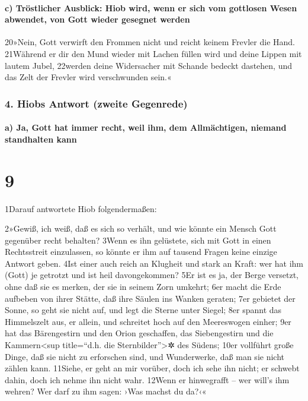 \hypertarget{c-truxf6stlicher-ausblick-hiob-wird-wenn-er-sich-vom-gottlosen-wesen-abwendet-von-gott-wieder-gesegnet-werden}{%
\paragraph{c) Tröstlicher Ausblick: Hiob wird, wenn er sich vom
gottlosen Wesen abwendet, von Gott wieder gesegnet
werden}\label{c-truxf6stlicher-ausblick-hiob-wird-wenn-er-sich-vom-gottlosen-wesen-abwendet-von-gott-wieder-gesegnet-werden}}

20»Nein, Gott verwirft den Frommen nicht und reicht keinem Frevler die
Hand. 21Während er dir den Mund wieder mit Lachen füllen wird und deine
Lippen mit lautem Jubel, 22werden deine Widersacher mit Schande bedeckt
dastehen, und das Zelt der Frevler wird verschwunden sein.«

\hypertarget{hiobs-antwort-zweite-gegenrede}{%
\subsubsection{4. Hiobs Antwort (zweite
Gegenrede)}\label{hiobs-antwort-zweite-gegenrede}}

\hypertarget{a-ja-gott-hat-immer-recht-weil-ihm-dem-allmuxe4chtigen-niemand-standhalten-kann}{%
\paragraph{a) Ja, Gott hat immer recht, weil ihm, dem Allmächtigen,
niemand standhalten
kann}\label{a-ja-gott-hat-immer-recht-weil-ihm-dem-allmuxe4chtigen-niemand-standhalten-kann}}

\hypertarget{section-8}{%
\section{9}\label{section-8}}

1Darauf antwortete Hiob folgendermaßen:

2»Gewiß, ich weiß, daß es sich so verhält, und wie könnte ein Mensch
Gott gegenüber recht behalten? 3Wenn es ihn gelüstete, sich mit Gott in
einen Rechtsstreit einzulassen, so könnte er ihm auf tausend Fragen
keine einzige Antwort geben. 4Ist einer auch reich an Klugheit und stark
an Kraft: wer hat ihm (Gott) je getrotzt und ist heil davongekommen? 5Er
ist es ja, der Berge versetzt, ohne daß sie es merken, der sie in seinem
Zorn umkehrt; 6er macht die Erde aufbeben von ihrer Stätte, daß ihre
Säulen ins Wanken geraten; 7er gebietet der Sonne, so geht sie nicht
auf, und legt die Sterne unter Siegel; 8er spannt das Himmelszelt aus,
er allein, und schreitet hoch auf den Meereswogen einher; 9er hat das
Bärengestirn und den Orion geschaffen, das Siebengestirn und die
Kammern\textless sup title=``d.h. die Sternbilder''\textgreater✲ des
Südens; 10er vollführt große Dinge, daß sie nicht zu erforschen sind,
und Wunderwerke, daß man sie nicht zählen kann. 11Siehe, er geht an mir
vorüber, doch ich sehe ihn nicht; er schwebt dahin, doch ich nehme ihn
nicht wahr. 12Wenn er hinwegrafft -- wer will's ihm wehren? Wer darf zu
ihm sagen: ›Was machst du da?‹«

